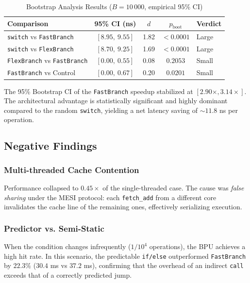 \begin{table}[ht]
\centering
\caption{Bootstrap Analysis Results ($B=10\,000$, empirical 95\% CI)}
\label{tab:bootstrap}
\begin{tabular}{@{}lcccl@{}}
\toprule
\textbf{Comparison} & \textbf{95\% CI (ns)} & \textbf{$d$} & \textbf{$p_{\text{boot}}$} & \textbf{Verdict} \\ \midrule
\texttt{switch} vs \texttt{FastBranch}     & $[8.95,\ 9.55]$ & 1.82 & $<0.0001$ & Large \\
\texttt{switch} vs \texttt{FlexBranch}     & $[8.70,\ 9.25]$ & 1.69 & $<0.0001$ & Large \\
\texttt{FlexBranch} vs \texttt{FastBranch} & $[0.00,\ 0.55]$ & 0.08 & $0.2053$  & Small \\
\texttt{FastBranch} vs Control             & $[0.00,\ 0.67]$ & 0.20 & $0.0201$  & Small \\ \bottomrule
\end{tabular}
\end{table}

The 95\% Bootstrap CI of the \texttt{FastBranch} speedup stabilized at $[2.90\times, 3.14\times]$. The architectural advantage is statistically significant and highly dominant compared to the random \texttt{switch}, yielding a net latency saving of $\sim11.8$ ns per operation.

\subsection{Negative Findings}\label{sec:negativos}

\subsubsection{Multi-threaded Cache Contention}
Performance collapsed to $0.45\times$ of the single-threaded case. The cause was \textit{false sharing} under the MESI protocol: each \texttt{fetch\_add} from a different core invalidates the cache line of the remaining ones, effectively serializing execution.

\subsubsection{Predictor vs. Semi-Static}
When the condition changes infrequently ($1/10^4$ operations), the BPU achieves a high hit rate. In this scenario, the predictable \texttt{if/else} outperformed \texttt{FastBranch} by $22.3\%$ ($30.4$ ms vs $37.2$ ms), confirming that the overhead of an indirect \texttt{call} exceeds that of a correctly predicted jump.
